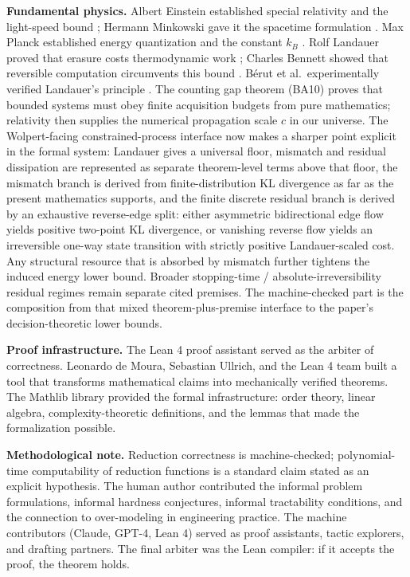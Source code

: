 \textbf{Fundamental physics.} Albert Einstein established special relativity and the light-speed bound \cite{einstein1905electrodynamics}; Hermann Minkowski gave it the spacetime formulation \cite{minkowski1908space}. Max Planck established energy quantization and the constant $k_B$ \cite{planck1901distribution}. Rolf Landauer proved that erasure costs thermodynamic work \cite{landauer1961irreversibility}; Charles Bennett showed that reversible computation circumvents this bound \cite{bennett1982thermodynamics}. Bérut et al.\ experimentally verified Landauer's principle \cite{berut2012experimental}. The counting gap theorem (BA10) proves that bounded systems must obey finite acquisition budgets from pure mathematics; relativity then supplies the numerical propagation scale $c$ in our universe. The Wolpert-facing constrained-process interface now makes a sharper point explicit in the formal system: Landauer gives a universal floor, mismatch and residual dissipation are represented as separate theorem-level terms above that floor, the mismatch branch is derived from finite-distribution KL divergence as far as the present mathematics supports, and the finite discrete residual branch is derived by an exhaustive reverse-edge split: either asymmetric bidirectional edge flow yields positive two-point KL divergence, or vanishing reverse flow yields an irreversible one-way state transition with strictly positive Landauer-scaled cost. Any structural resource that is absorbed by mismatch further tightens the induced energy lower bound. Broader stopping-time / absolute-irreversibility residual regimes remain separate cited premises. The machine-checked part is the composition from that mixed theorem-plus-premise interface to the paper's decision-theoretic lower bounds.

\textbf{Proof infrastructure.} The Lean 4 proof assistant \cite{demoura2021lean4} served as the arbiter of correctness. Leonardo de Moura, Sebastian Ullrich, and the Lean 4 team built a tool that transforms mathematical claims into mechanically verified theorems. The Mathlib library \cite{mathlib2020} provided the formal infrastructure: order theory, linear algebra, complexity-theoretic definitions, and the lemmas that made the formalization possible.

\textbf{Methodological note.} Reduction correctness is machine-checked; polynomial-time computability of reduction functions is a standard claim stated as an explicit hypothesis. The human author contributed the informal problem formulations, informal hardness conjectures, informal tractability conditions, and the connection to over-modeling in engineering practice. The machine contributors (Claude, GPT-4, Lean 4) served as proof assistants, tactic explorers, and drafting partners. The final arbiter was the Lean compiler: if it accepts the proof, the theorem holds.

